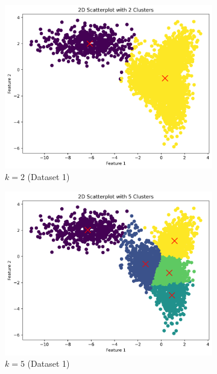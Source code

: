 \documentclass{article}
\begin{document}
\begin{figure}[h]
    \centering
    \begin{subfigure}[b]{0.45\textwidth}
        \includegraphics[width=\textwidth]{figures/random_2d_scatter_k2_d0.png}
        \caption{$k=2$ (Dataset 1)}
        \label{fig:2d_k2}
    \end{subfigure}
    \begin{subfigure}[b]{0.45\textwidth}
        \includegraphics[width=\textwidth]{figures/random_2d_scatter_k5_d0.png}
        \caption{$k=5$ (Dataset 1)}
        \label{fig:2d_k5}
    \end{subfigure}
    \begin{subfigure}[b]{0.45\textwidth}

\end{subfigure}
\end{figure}
\end{document}

